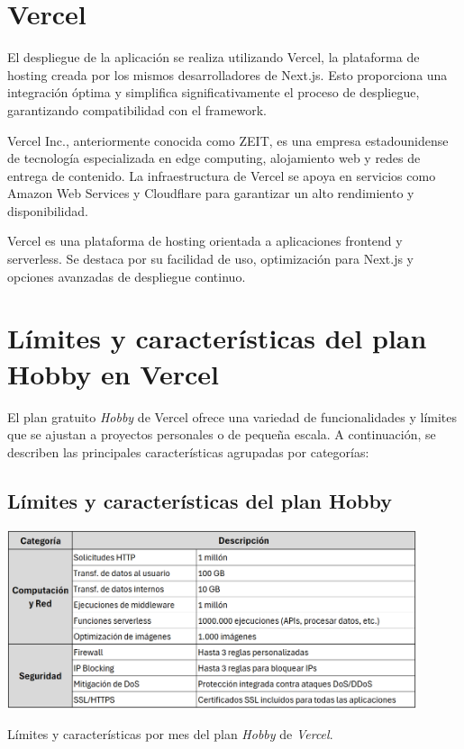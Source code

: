 \section{Vercel}
El despliegue de la aplicación se realiza utilizando Vercel, la plataforma de hosting creada por los mismos desarrolladores de Next.js. Esto proporciona una integración óptima y simplifica significativamente el proceso de despliegue, garantizando compatibilidad con el framework.

Vercel Inc., anteriormente conocida como ZEIT, es una empresa estadounidense de tecnología especializada en edge computing, alojamiento web y redes de entrega de contenido. La infraestructura de Vercel se apoya en servicios como Amazon Web Services y Cloudflare para garantizar un alto rendimiento y disponibilidad.

Vercel es una plataforma de hosting orientada a aplicaciones frontend y serverless. Se destaca por su facilidad de uso, optimización para Next.js y opciones avanzadas de despliegue continuo.

\section{Límites y características del plan Hobby en Vercel}

El plan gratuito \textit{Hobby} de Vercel ofrece una variedad de funcionalidades y límites que se ajustan a proyectos personales o de pequeña escala. A continuación, se describen las principales características agrupadas por categorías:

\subsection{Límites y características del plan Hobby}

\begin{table}[htbp]
    \centering
    \includegraphics[width=0.9\textwidth]{figures/vercel_plan_hobby.png}
    \captionsetup{skip=10pt}
    \caption{Límites y características por mes del plan \textit{Hobby} de \textit{Vercel}.}
    \label{tab:vercel_plan_hobby}
\end{table}


